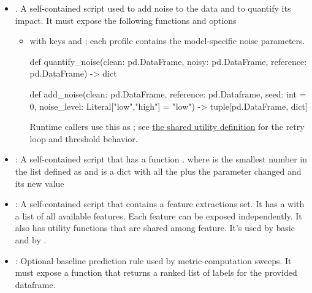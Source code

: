 \documentclass[11pt]{article}
\begin{document}
\begin{itemize}
    \item {}. A self-contained script used to add noise to the data and to quantify its impact. 
    It must expose the following functions and options
    \begin{itemize}
    \item {} with keys  and ; each profile contains the model-specific noise parameters.
    \label{def:noise-adder-interface}
    \begin{DocCode}
    def quantify_noise(clean: pd.DataFrame, noisy: pd.DataFrame, reference: pd.DataFrame) -> dict
    \end{DocCode}
    \begin{DocCode}
    def add_noise(clean: pd.DataFrame, reference: pd.Dataframe, seed: int = 0, noise_level: Literal["low","high"] = "low") -> tuple[pd.DataFrame, dict]
    \end{DocCode}
    Runtime callers use this as ; see \hyperref[def:add-noise-utility]{the shared  utility definition} for the retry loop and threshold behavior.
    \end{itemize}
    \item {}: A self-contained script that has a function .
    where  is the smallest number in the list  defined as  and  is a dict with all the  plus the parameter changed and its new value
    \item {}: A self-contained script that contains a feature extractions set. It has a  with a list of all available features.
    Each feature can be exposed independently. It also has utility functions that are shared among feature. 
    It's used by basic  and by .
    \item {}: Optional baseline prediction rule used by metric-computation sweeps.
    \label{def:basic-rule-predict-interface}
    It must expose a  function that returns a ranked list of labels for the provided dataframe.
\end{itemize}
\end{document}
